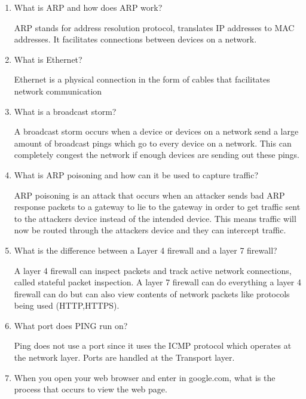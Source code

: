 \documentclass{exam}
\begin{document}
\begin{enumerate}
\begin{solution}
\begin{enumerate}
				
			\end{enumerate}
		\end{solution}
		\item What is ARP and how does ARP work?
		\begin{solution}
			ARP stands for address resolution protocol, translates IP addresses to MAC addresses. It facilitates connections between devices on a network.
		\end{solution}
		\item What is Ethernet?
		\begin{solution}
			Ethernet is a physical connection in the form of cables that facilitates network communication 
		\end{solution}
		\item What is a broadcast storm?
		\begin{solution}
			A broadcast storm occurs when a device or devices on a network send a large amount of broadcast pings which go to every device on a network. This can completely congest the network if enough devices are sending out these pings. 
		\end{solution}
		\item What is ARP poisoning and how can it be used to capture traffic? 
		\begin{solution}
			ARP poisoning is an attack that occurs when an attacker sends bad ARP response packets to a gateway to lie to the gateway in order to get traffic sent to the attackers device instead of the intended device. This means traffic will now be routed through the attackers device and they can intercept traffic. 
		\end{solution}
		\item What is the difference between a Layer 4 firewall and a layer 7 firewall? 
		\begin{solution}
			A layer 4 firewall can inspect packets and track active network connections, called stateful packet inspection. A layer 7 firewall can do everything a layer 4 firewall can do but can also view contents of network packets like protocols being used (HTTP,HTTPS).  
		\end{solution}
		\item What port does PING run on? 
		\begin{solution}
			Ping does not use a port since it uses the ICMP protocol which operates at the network layer. Ports are handled at the Transport layer. 
		\end{solution}
		\item When you open your web browser and enter in google.com, what is the process that occurs to view the web page. 
	\end{enumerate}
\end{document}
